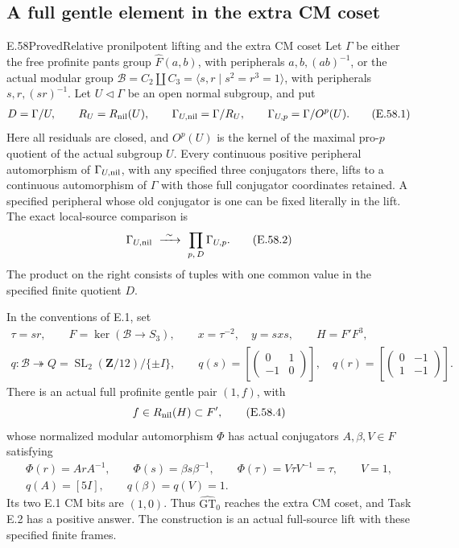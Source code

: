 \subsection{A full gentle element in the extra CM coset}

\begin{statement}{E.58}{Proved}{Relative pronilpotent lifting and the extra CM coset}
Let \(\Gamma\) be either the free profinite pants group
\(\widehat F(a,b)\), with peripherals \(a,b,(ab)^{-1}\),
or the actual modular group
\(\mathcal B=C_2\amalg C_3=\langle s,r\mid s^2=r^3=1\rangle\),
with peripherals \(s,r,(sr)^{-1}\).
Let \(U\triangleleft\Gamma\) be an open normal subgroup, and put
\[
 \begin{gathered}
 D=\Gamma/U,\qquad R_U=R_{\rm nil}(U),\qquad
 \Gamma_{U,\rm nil}=\Gamma/R_U,\qquad
 \Gamma_{U,p}=\Gamma/O^p(U).
 \end{gathered}
 \tag{E.58.1}
\]
Here all residuals are closed, and \(O^p(U)\) is the kernel
of the maximal pro-\(p\) quotient of the actual subgroup \(U\).
Every continuous positive peripheral automorphism of
\(\Gamma_{U,\rm nil}\), with any specified three conjugators
there, lifts to a continuous automorphism of \(\Gamma\) with
those full conjugator coordinates retained. A specified peripheral
whose old conjugator is one can be fixed literally in the lift.
The exact local-source comparison is
\[
 \Gamma_{U,\rm nil}
       \ \xrightarrow{\ \sim\ }\
       \mathop{\prod}_{p,\,D}\Gamma_{U,p}.
 \tag{E.58.2}
\]
The product on the right consists of tuples with one common value
in the specified finite quotient \(D\).

In the conventions of E.1, set
\[
 \begin{gathered}
 \tau=sr,\qquad F=\ker(\mathcal B\to S_3),\qquad
 x=\tau^{-2},\quad y=sxs,\qquad H=F'F^3,\\
 q:\mathcal B\twoheadrightarrow
 Q=\operatorname{SL}_2(\mathbf Z/12)/\{\pm I\},\qquad
 q(s)=\left[\begin{pmatrix}0&1\\-1&0\end{pmatrix}\right],\quad
 q(r)=\left[\begin{pmatrix}0&-1\\1&-1\end{pmatrix}\right].
 \end{gathered}
 \tag{E.58.3}
\]
There is an actual full profinite gentle pair \((1,f)\), with
\[
 f\in R_{\rm nil}(H)\subset F',
 \tag{E.58.4}
\]
whose normalized modular automorphism \(\Phi\) has actual
conjugators \(A,\beta,V\in F\) satisfying
\[
 \begin{gathered}
 \Phi(r)=ArA^{-1},\qquad
 \Phi(s)=\beta s\beta^{-1},\qquad
 \Phi(\tau)=V\tau V^{-1}=\tau,\qquad V=1,\\
 q(A)=[5I],\qquad q(\beta)=q(V)=1.
 \end{gathered}
 \tag{E.58.5}
\]
Its two E.1 CM bits are \((1,0)\). Thus
\(\widehat{\mathrm{GT}}_0\) reaches the extra CM coset,
and Task E.2 has a positive answer.
The construction is an actual full-source lift with these
specified finite frames.
\end{statement}

